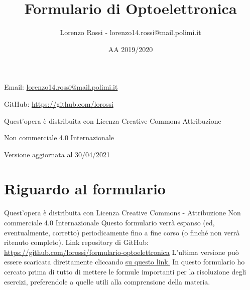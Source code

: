 \documentclass{article}
\title{Formulario di Optoelettronica}
\author{Lorenzo Rossi - lorenzo14.rossi@mail.polimi.it}
\date{AA 2019/2020}
\begin{document}
\maketitle

\vspace{18em}

\large
\begin{doublespacing}\hypersetup{
    urlcolor=black,
  }
  \centerline{Email: \href{mailto://lorenzo14.rossi@mail.polimi.it}{lorenzo14.rossi@mail.polimi.it}}
  \centerline{GitHub: \url{https://github.com/lorossi}}

  \vspace{18em}
  \centerline{Quest'opera è distribuita con Licenza Creative Commons Attribuzione}
  \centerline{Non commerciale 4.0 Internazionale \ccbynceu}
  \centerline{Versione aggiornata al 30/04/2021}
\end{doublespacing}
\newpage


\tableofcontents
\clearpage
{}
\newpage

\section{Riguardo al formulario}
Quest'opera è distribuita con Licenza Creative Commons - Attribuzione Non commerciale 4.0 Internazionale \ccbynceu \newline
Questo formulario verrà espanso (ed, eventualmente, corretto) periodicamente fino a fine corso (o finché non verrà ritenuto completo). \newline
Link repository di GitHub: \url{https://github.com/lorossi/formulario-optoelettronica} \newline
L'ultima versione può essere scaricata direttamente cliccando \href{https://github.com/lorossi/formulario-optoelettronic/raw/master/formulario-optoelettronica.pdf}{su questo link.} \newline
In questo formulario ho cercato prima di tutto di mettere le formule importanti per la risoluzione degli esercizi, preferendole a quelle utili alla comprensione della materia.
\end{document}

